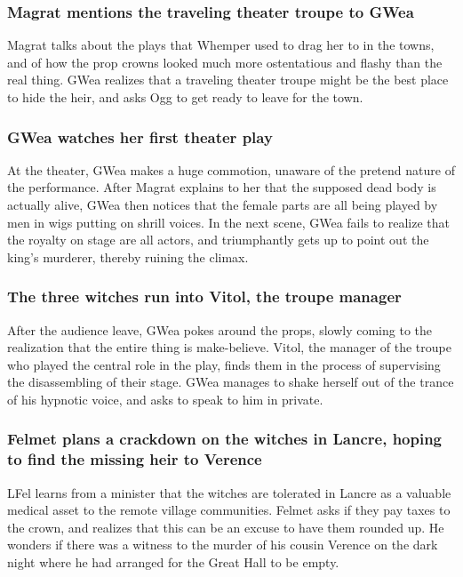 \subsubsection{\Gls{Magrat} mentions the traveling theater troupe to \Gls{GWea}}
\Gls{Magrat} talks about the plays that \Gls{Whemper} used to drag her to in the towns, and of how
the prop crowns looked much more ostentatious and flashy than the real thing. \Gls{GWea} realizes
that a traveling theater troupe might be the best place to hide the heir, and asks \Gls{Ogg} to
get ready to leave for the town.

\subsubsection{\Gls{GWea} watches her first theater play}
At the theater, \Gls{GWea} makes a huge commotion, unaware of the pretend nature of the performance.
After \Gls{Magrat} explains to her that the supposed dead body is actually alive, \Gls{GWea} then
notices that the female parts are all being played by men in wigs putting on shrill voices. In the
next scene, \Gls{GWea} fails to realize that the royalty on stage are all actors, and triumphantly
gets up to point out the king's murderer, thereby ruining the climax.

\subsubsection{The three witches run into \Gls{Vitol}, the troupe manager}
After the audience leave, \Gls{GWea} pokes around the props, slowly coming to the realization that
the entire thing is make-believe. \Gls{Vitol}, the manager of the troupe who played the central role
in the play, finds them in the process of supervising the disassembling of their stage. \Gls{GWea}
manages to shake herself out of the trance of his hypnotic voice, and asks to speak to him in
private.

\subsubsection{\Gls{Felmet} plans a crackdown on the witches in Lancre, hoping to find the missing
    heir to \Gls{Verence}}
\Gls{LFel} learns from a minister that the witches are tolerated in Lancre as a valuable medical
asset to the remote village communities. \Gls{Felmet} asks if they pay taxes to the crown, and
realizes that this can be an excuse to have them rounded up. He wonders if there was a witness to
the murder of his cousin \Gls{Verence} on the dark night where he had arranged for the Great Hall
to be empty.

